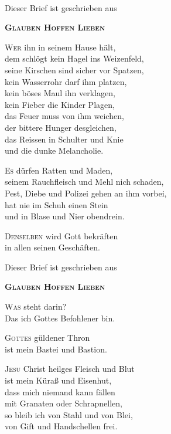 \documentclass[
  paper=a3
  fontsize=16pt,
  parskip=half,
]{scrartcl}
\newcommand{\initial}[3][initialcolor]{%
  \lettrine[
    lhang=0.5,
    lines=2,
    findent=1pt,
    lraise=0.6,
    depth=-1
  ]{\color{#1}\initials#2}{#3}
}
\newcommand{\poemwitdh}{\widthof{seinem Rauchfleisch und Mehl nicht schaden}}
\newcommand{\glaubenhoffenlieben}{
  \vspace{0.5em}
  \centerline{\Large Dieser Brief ist geschrieben aus} \medskip
  \centerline{\Large \serif \textbf{\textsc{Glauben Hoffen Lieben}}}%
}
\begin{document}
\begin{center}
   \\[\baselineskip]
\end{center}

\glaubenhoffenlieben

\centering
\begin{minipage}{\poemwitdh}
\initial{W}{er} ihn in seinem Hause hält, \\
dem schlögt kein Hagel ins Weizenfeld, \\
seine Kirschen sind sicher vor Spatzen, \\
kein Wasserrohr darf ihm platzen, \\
kein böses Maul ihn verklagen, \\
kein Fieber die Kinder Plagen, \\
das Feuer muss von ihm weichen, \\
der bittere Hunger desgleichen, \\
das Reissen in Schulter und Knie \\
und die dunke Melancholie.
\end{minipage}

\centering
\begin{minipage}{\poemwitdh}
\initial{E}{s} dürfen Ratten und Maden, \\
seinem Rauchfleisch und Mehl nich schaden, \\
Pest, Diebe und Polizei gehen an ihm vorbei, \\
hat nie im Schuh einen Stein \\
und in Blase und Nier obendrein.
\end{minipage}

\centering
\begin{minipage}{\poemwitdh}
\initial{D}{enselben} wird Gott bekräften \\
in allen seinen Geschäften.
\end{minipage}

\glaubenhoffenlieben

\centering
\begin{minipage}{\poemwitdh}
\initial{W}{as} steht darin? \\
Das ich Gottes Befohlener bin.
\end{minipage}


\centering
\begin{minipage}{\poemwitdh}
\initial{G}{ottes} güldener Thron \\
ist mein Bastei und Bastion.

\initial{J}{esu} Christ heilges Fleisch und Blut \\
ist mein Küraß und Eisenhut, \\
dass mich niemand kann fällen \\
mit Granaten oder Schrapnellen, \\
so bleib ich von Stahl und von Blei, \\
von Gift und Handschellen frei.
\end{minipage}
\end{document}
